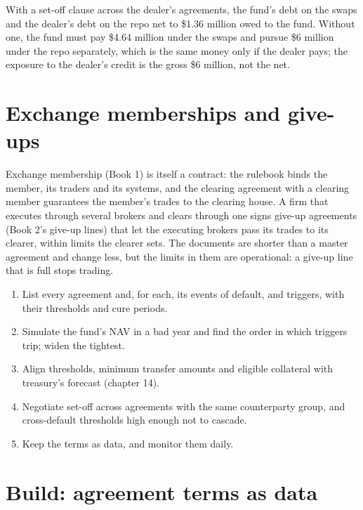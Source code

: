 With a set-off clause across the dealer's agreements, the fund's debt on the swaps and the dealer's debt on the repo net to \$1.36 million owed to
the fund. Without one, the fund must pay \$4.64 million under the swaps and pursue \$6 million under the repo separately, which is the same money
only if the dealer pays; the exposure to the dealer's credit is the gross \$6 million, not the net.

\section{Exchange memberships and give-ups}

Exchange membership (Book 1) is itself a contract: the rulebook binds the member, its traders and its systems, and the clearing agreement with a
clearing member guarantees the member's trades to the clearing house. A firm that executes through several brokers and clears through one signs
give-up agreements (Book 2's give-up lines) that let the executing brokers pass its trades to its clearer, within limits the clearer sets. The
documents are shorter than a master agreement and change less, but the limits in them are operational: a give-up line that is full stops trading.

\begin{method}\label{met:fm:legal-documentation:negotiate}
\begin{enumerate}
\item List every agreement and, for each, its events of default,  and triggers, with their thresholds and cure periods.
\item Simulate the fund's NAV in a bad year and find the order in which triggers trip; widen the tightest.
\item Align thresholds, minimum transfer amounts and eligible collateral with treasury's forecast (chapter 14).
\item Negotiate set-off across agreements with the same counterparty group, and cross-default thresholds high enough not to cascade.
\item Keep the terms as data, and monitor them daily.
\end{enumerate}
\end{method}

\section{Build: agreement terms as data}\label{bld:fm:legal-documentation:docterms}

